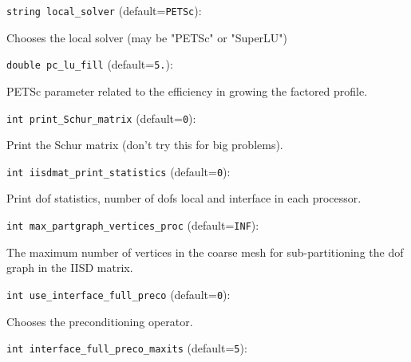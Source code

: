 \item\verb+string local_solver+ {\rm(default=\verb|PETSc|)}:

Chooses the local solver (may be "PETSc" or "SuperLU")

\item\verb+double pc_lu_fill+ {\rm(default=\verb|5.|)}:

PETSc parameter related to the efficiency in growing
  the factored profile.

\item\verb+int print_Schur_matrix+ {\rm(default=\verb|0|)}:

Print the Schur matrix (don't try this for big problems).

\item\verb+int iisdmat_print_statistics+ {\rm(default=\verb|0|)}:

Print dof statistics, number of dofs local and interface in each
processor. 

\item\verb+int max_partgraph_vertices_proc+ {\rm(default=\verb|INF|)}:

The maximum number of vertices in the coarse mesh for
sub-partitioning the dof graph in the IISD matrix. 

\item\verb+int use_interface_full_preco+ {\rm(default=\verb|0|)}:

Chooses the preconditioning operator. 

\item\verb+int interface_full_preco_maxits+ {\rm(default=\verb|5|)}:

